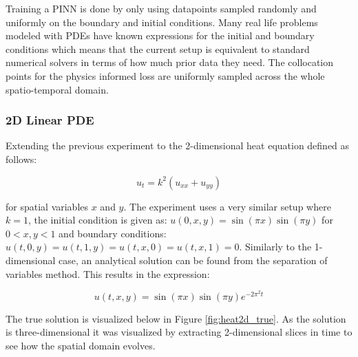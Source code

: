 Training a PINN is done by only using datapoints sampled randomly and uniformly on the boundary and initial conditions. Many real life problems modeled with PDEs have known expressions for the initial and boundary conditions which means that the current setup is equivalent to standard numerical solvers in terms of how much prior data they need. The collocation points for the physics informed loss are uniformly sampled across the whole spatio-temporal domain.

\subsubsection{2D Linear PDE}

Extending the previous experiment to the 2-dimensional heat equation defined as follows:

\begin{equation}
    u_t = k^2 (u_{xx} + u_{yy})
    \label{eq:heat2d}
\end{equation}

\noindent for spatial variables $x$ and $y$. The experiment uses a very similar setup where $k = 1$, the initial condition is given as: $u(0, x, y) = \sin(\pi x) \sin(\pi y)$ for $0 < x, y < 1$ and boundary conditions: $u(t, 0, y) = u(t, 1, y) = u(t, x, 0) = u(t, x, 1) = 0$. Similarly to the 1-dimensional case, an analytical solution can be found from the separation of variables method. This results in the expression:

\begin{equation}
    u(t, x, y) = \sin(\pi x) \sin(\pi y) e^{- 2 \pi^2 t}
    \label{eq:heat2dsolution}
\end{equation}

The true solution is visualized below in Figure \ref{fig:heat2d_true}. As the solution is three-dimensional it was visualized by extracting 2-dimensional slices in time to see how the spatial domain evolves.

